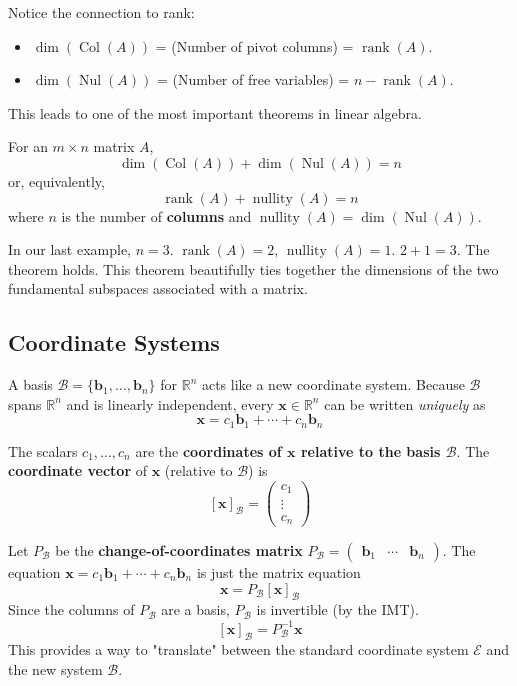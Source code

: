 \documentclass[oneside]{book}
\begin{document}
Notice the connection to rank:
\begin{itemize}
    \item $\dim(\operatorname{Col}(A))$ = (Number of pivot columns) = $\operatorname{rank}(A)$.
    \item $\dim(\operatorname{Nul}(A))$ = (Number of free variables) = $n - \operatorname{rank}(A)$.
\end{itemize}
This leads to one of the most important theorems in linear algebra.

\begin{theorem}
For an $m \times n$ matrix $A$,
\[ \dim(\operatorname{Col}(A)) + \dim(\operatorname{Nul}(A)) = n \]
or, equivalently,
\[ \operatorname{rank}(A) + \operatorname{nullity}(A) = n \]
where $n$ is the number of \textbf{columns} and $\operatorname{nullity}(A) = \dim(\operatorname{Nul}(A))$.
\end{theorem}
In our last example, $n=3$. $\operatorname{rank}(A) = 2$, $\operatorname{nullity}(A) = 1$.
$2 + 1 = 3$. The theorem holds.
This theorem beautifully ties together the dimensions of the two fundamental subspaces associated with a matrix.

\subsection{Coordinate Systems}
A basis $\mathcal{B} = \{\mathbf{b}_1, \ldots, \mathbf{b}_n\}$ for $\mathbb{R}^n$ acts like a new coordinate system.
Because $\mathcal{B}$ spans $\mathbb{R}^n$ and is linearly independent, every $\mathbf{x} \in \mathbb{R}^n$ can be written \emph{uniquely} as
\[ \mathbf{x} = c_1\mathbf{b}_1 + \cdots + c_n\mathbf{b}_n \]
\begin{definition}
The scalars $c_1, \ldots, c_n$ are the \textbf{coordinates of $\mathbf{x}$ relative to the basis $\mathcal{B}$}.
The \textbf{coordinate vector} of $\mathbf{x}$ (relative to $\mathcal{B}$) is
\[ [\mathbf{x}]_{\mathcal{B}} = \begin{pmatrix} c_1 \\ \vdots \\ c_n \end{pmatrix} \]
\end{definition}

Let $P_{\mathcal{B}}$ be the \textbf{change-of-coordinates matrix} $P_{\mathcal{B}} = \begin{pmatrix} \mathbf{b}_1 & \cdots & \mathbf{b}_n \end{pmatrix}$.
The equation $\mathbf{x} = c_1\mathbf{b}_1 + \cdots + c_n\mathbf{b}_n$ is just the matrix equation
\[ \mathbf{x} = P_{\mathcal{B}} [\mathbf{x}]_{\mathcal{B}} \]
Since the columns of $P_{\mathcal{B}}$ are a basis, $P_{\mathcal{B}}$ is invertible (by the IMT).
\[ [\mathbf{x}]_{\mathcal{B}} = P_{\mathcal{B}}^{-1} \mathbf{x} \]
This provides a way to "translate" between the standard coordinate system $\mathcal{E}$ and the new system $\mathcal{B}$.
\end{document}
